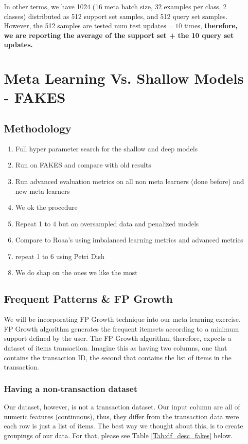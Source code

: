 \documentclass{article}
\begin{document}
 
\noindent In other terms, we have 1024 (16 meta batch size, 32 examples per class, 2 classes) distributed as 512 support set samples, and 512 query set samples. However, the 512 samples are tested $\text{num\_test\_updates} = 10$ times, \textbf{therefore, we are reporting the average of the support set + the 10 query set updates.}


\section{Meta Learning Vs. Shallow Models - FAKES}

\subsection{Methodology}
\begin{enumerate}
    \item Full hyper parameter search for the shallow and deep models
    \item Run on FAKES and compare with old results
    \item Run advanced evaluation metrics on all non meta learners (done before) and new meta learners
    \item We ok the procedure
    \item Repeat 1 to 4 but on oversampled data and penalized models
    \item Compare to Roaa's using imbalanced learning metrics and advanced metrics
    \item repeat 1 to 6 using Petri Dish
    \item We do shap on the ones we like the most
\end{enumerate}

\subsection{Frequent Patterns \& FP Growth}
\label{sec:fp_itemset_transformation}
We will be incorporating FP Growth technique into our meta learning exercise. FP Growth algorithm generates the frequent itemsets according to a minimum support defined by the user. The FP Growth algorithm, therefore, expects a dataset of items transaction. Imagine this as having two columns, one that contains the transaction ID, the second that contains the list of items in the transaction. 

\subsubsection*{Having a non-transaction dataset}
Our dataset, however, is not a transaction dataset. Our input column are all of numeric features (continuous), thus, they differ from the transaction data were each row is just a list of items. The best  way we thought about this, is to create groupings of our data. For that, please see Table \ref{Tab:df_desc_fakes} below.
\end{document}
